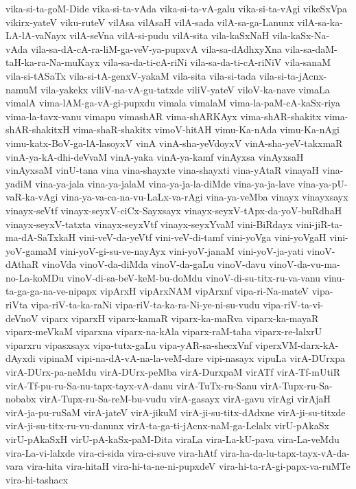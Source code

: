 {vika-si-ta-goM-Dide
vika-si-ta-vAda
vika-si-ta-vA-galu
vika-si-ta-vAgi
vikeSxVpa
vikirx-yateV
viku-ruteV
vilAsa
vilAsaH
vilA-sada
vilA-sa-ga-Lanunx
vilA-sa-ka-LA-lA-vaNayx
vilA-seVna
vilA-si-pudu
vilA-sita
vila-kaSxNaH
vila-kaSx-Na-vAda
vila-sa-dA-cA-ra-liM-ga-veV-ya-pupxvA
vila-sa-dAdhxyXna
vila-sa-daM-taH-ka-ra-Na-muKayx
vila-sa-da-ti-cA-riNi
vila-sa-da-ti-cA-riNiV
vila-sanaM
vila-si-tASaTx
vila-si-tA-genxV-yakaM
vila-sita
vila-si-tada
vila-si-ta-jAcnx-namuM
vila-yakekx
viliV-na-vA-gu-tatxde
viliV-yateV
viloV-ka-nave
vimaLa
vimalA
vima-lAM-ga-vA-gi-pupxdu
vimala
vimalaM
vima-la-paM-cA-kaSx-riya
vima-la-tavx-vanu
vimapu
vimashAR
vima-shARKAyx
vima-shAR-shakitx
vima-shAR-shakitxH
vima-shaR-shakitx
vimoV-hitAH
vimu-Ka-nAda
vimu-Ka-nAgi
vimu-katx-BoV-ga-lA-lasoyxV
vinA
vinA-sha-yeVdoyxV
vinA-sha-yeV-takxmaR
vinA-ya-kA-dhi-deVvaM
vinA-yaka
vinA-ya-kamf
vinAyxsa
vinAyxsaH
vinAyxsaM
vinU-tana
vina
vina-shayxte
vina-shayxti
vina-yAtaR
vinayaH
vina-yadiM
vina-ya-jala
vina-ya-jalaM
vina-ya-ja-la-diMde
vina-ya-ja-lave
vina-ya-pU-vaR-ka-vAgi
vina-ya-va-ca-na-vu-LaLx-va-rAgi
vina-ya-veMba
vinayx
vinayxsayx
vinayx-seVtf
vinayx-seyxV-ciCx-Sayxsayx
vinayx-seyxV-tApx-da-yoV-buRdhaH
vinayx-seyxV-tatxta
vinayx-seyxVtf
vinayx-seyxYvaM
vini-BiRdayx
vini-jiR-ta-ma-dA-SaTxkaH
vini-veV-da-yeVtf
vini-veV-di-tamf
vini-yoVga
vini-yoVgaH
vini-yoV-gamaM
vini-yoV-gi-su-ve-nayAyx
vini-yoV-janaM
vini-yoV-ja-yati
vinoV-dAthaR
vinoVda
vinoV-da-diMda
vinoV-da-gaLu
vinoV-davu
vinoV-da-vu-ma-no-La-koMDu
vinoV-di-sa-beV-keM-bu-doMdu
vinoV-di-su-titx-ru-va-vanu
vinu-ta-ga-ga-na-ve-nipapx
vipArxH
vipArxNAM
vipArxnf
vipa-ri-Na-mateV
vipa-riVta
vipa-riV-ta-ka-raNi
vipa-riV-ta-ka-ra-Ni-ye-ni-su-vudu
vipa-riV-ta-vi-deVnoV
viparx
viparxH
viparx-kamaR
viparx-ka-maRva
viparx-ka-mayaR
viparx-meVkaM
viparxna
viparx-na-kAla
viparx-raM-taha
viparx-re-lalxrU
viparxru
vipasxsayx
vipa-tutx-gaLu
vipa-yAR-sa-shecxVnf
viperxVM-darx-kA-dAyxdi
vipinaM
vipi-na-dA-vA-na-la-veM-dare
vipi-nasayx
vipuLa
virA-DUrxpa
virA-DUrx-pa-neMdu
virA-DUrx-peMba
virA-DurxpaM
virATf
virA-Tf-mUtiR
virA-Tf-pu-ru-Sa-nu-tapx-tayx-vA-danu
virA-TuTx-ru-Sanu
virA-Tupx-ru-Sa-nobabx
virA-Tupx-ru-Sa-reM-bu-vudu
virA-gasayx
virA-gavu
virAgi
virAjaH
virA-ja-pu-ruSaM
virA-jateV
virA-jikuM
virA-ji-su-titx-dAdxne
virA-ji-su-titxde
virA-ji-su-titx-ru-vu-danunx
virA-ta-ga-ti-jAcnx-naM-ga-Lelalx
virU-pAkaSx
virU-pAkaSxH
virU-pA-kaSx-paM-Dita
viraLa
vira-La-kU-pava
vira-La-veMdu
vira-La-vi-lalxde
vira-ci-sida
vira-ci-suve
vira-hAtf
vira-ha-da-lu-tapx-tayx-vA-da-vara
vira-hita
vira-hitaH
vira-hi-ta-ne-ni-pupxdeV
vira-hi-ta-rA-gi-papx-va-ruMTe
vira-hi-tashacx
}
